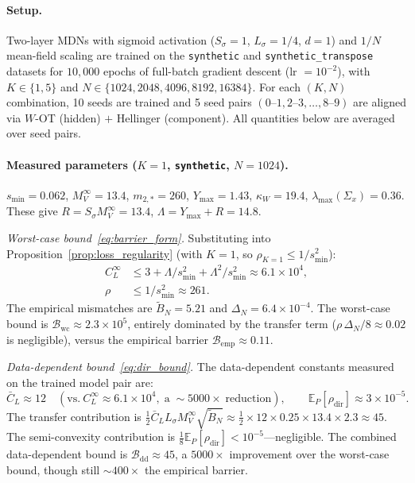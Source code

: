 \documentclass[11pt]{article}
\newcommand{\E}{\mathbb{E}}
\newcommand{\cB}{\mathcal{B}}
\begin{document}
\paragraph{Setup.}
Two-layer MDNs with sigmoid activation
($S_\sigma = 1$, $L_\sigma = 1/4$, $d = 1$)
and $1/N$ mean-field scaling
are trained on the \texttt{synthetic} and \texttt{synthetic\_transpose}
datasets for $10{,}000$ epochs of full-batch gradient descent
(lr $= 10^{-2}$),
with $K \in \{1, 5\}$ and $N \in \{1024, 2048, 4096, 8192, 16384\}$.
For each $(K, N)$ combination, 10 seeds are trained and
5 seed pairs $(0\text{--}1, 2\text{--}3, \ldots, 8\text{--}9)$
are aligned via $W$-OT (hidden) $+$ Hellinger (component).
All quantities below are averaged over seed pairs.

\paragraph{Measured parameters ($K=1$, \texttt{synthetic}, $N=1024$).}
$s_{\min} = 0.062$,
$M_V^\infty = 13.4$,
$m_{2,*} = 260$,
$Y_{\max} = 1.43$,
$\kappa_W = 19.4$,
$\lambda_{\max}(\Sigma_x) = 0.36$.
These give $R = S_\sigma M_V^\infty = 13.4$,
$\Lambda = Y_{\max} + R = 14.8$.

\emph{Worst-case bound~\eqref{eq:barrier_form}.}
Substituting into Proposition~\ref{prop:loss_regularity}
(with $K=1$, so $\rho_{K=1} \le 1/s_{\min}^2$):
\begin{align*}
  C_L^\infty
  &\le 3 + \Lambda/s_{\min}^2 + \Lambda^2/s_{\min}^2
  \approx 6.1 \times 10^4, \\
  \rho
  &\le 1/s_{\min}^2 \approx 261.
\end{align*}
The empirical mismatches are
$\tilde B_N = 5.21$ and $\Delta_N = 6.4 \times 10^{-4}$.
The worst-case bound is
$\cB_{\mathrm{wc}} \approx 2.3 \times 10^5$,
entirely dominated by the transfer term
($\rho\,\Delta_N/8 \approx 0.02$ is negligible),
versus the empirical barrier $\cB_{\mathrm{emp}} \approx 0.11$.

\emph{Data-dependent bound~\eqref{eq:dir_bound}.}
The data-dependent constants measured on the trained model pair are:
\[
  \bar C_L \approx 12
  \quad(\text{vs.}\ C_L^\infty \approx 6.1 \times 10^4,
  \;\text{a}\;\sim\!5000\times\;\text{reduction}),
  \qquad
  \E_P[\rho_{\mathrm{dir}}] \approx 3 \times 10^{-5}.
\]
The transfer contribution is
$\tfrac{1}{2}\bar C_L L_\sigma M_V^\infty\sqrt{\tilde B_N}
\approx \tfrac{1}{2} \times 12 \times 0.25 \times 13.4 \times 2.3
\approx 45$.
The semi-convexity contribution is
$\tfrac{1}{8}\E_P[\rho_{\mathrm{dir}}] < 10^{-5}$---negligible.
The combined data-dependent bound is
$\cB_{\mathrm{dd}} \approx 45$,
a $5000\times$ improvement over the worst-case bound,
though still $\sim 400\times$ the empirical barrier.
\end{document}
